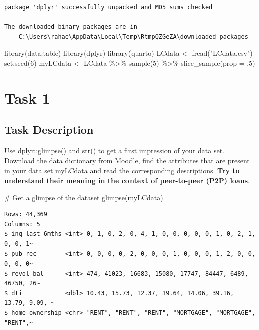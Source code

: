 \documentclass[
  letterpaper,
  DIV=11,
  numbers=noendperiod]{scrartcl}
\newenvironment{Shaded}{\begin{snugshade}}{\end{snugshade}}
\newcommand{\AttributeTok}[1]{\textcolor[rgb]{0.40,0.45,0.13}{#1}}
\newcommand{\CommentTok}[1]{\textcolor[rgb]{0.37,0.37,0.37}{#1}}
\newcommand{\DecValTok}[1]{\textcolor[rgb]{0.68,0.00,0.00}{#1}}
\newcommand{\FunctionTok}[1]{\textcolor[rgb]{0.28,0.35,0.67}{#1}}
\newcommand{\NormalTok}[1]{\textcolor[rgb]{0.00,0.23,0.31}{#1}}
\newcommand{\OtherTok}[1]{\textcolor[rgb]{0.00,0.23,0.31}{#1}}
\newcommand{\SpecialCharTok}[1]{\textcolor[rgb]{0.37,0.37,0.37}{#1}}
\newcommand{\StringTok}[1]{\textcolor[rgb]{0.13,0.47,0.30}{#1}}
\begin{document}
\begin{verbatim}
package 'dplyr' successfully unpacked and MD5 sums checked

The downloaded binary packages are in
    C:\Users\rahae\AppData\Local\Temp\RtmpQZGeZA\downloaded_packages
\end{verbatim}

\begin{Shaded}
\begin{Highlighting}[]
\FunctionTok{library}\NormalTok{(data.table)}
\FunctionTok{library}\NormalTok{(dplyr)}
\FunctionTok{library}\NormalTok{(quarto)}
\NormalTok{LCdata }\OtherTok{\textless{}{-}} \FunctionTok{fread}\NormalTok{(}\StringTok{"LCdata.csv"}\NormalTok{)}
\FunctionTok{set.seed}\NormalTok{(}\DecValTok{6}\NormalTok{)}
\NormalTok{myLCdata }\OtherTok{\textless{}{-}}\NormalTok{ LCdata }\SpecialCharTok{\%\textgreater{}\%} \FunctionTok{sample}\NormalTok{(}\DecValTok{5}\NormalTok{) }\SpecialCharTok{\%\textgreater{}\%} \FunctionTok{slice\_sample}\NormalTok{(}\AttributeTok{prop =}\NormalTok{ .}\DecValTok{5}\NormalTok{)}
\end{Highlighting}
\end{Shaded}

\hypertarget{task-1}{%
\section{Task 1}\label{task-1}}

\hypertarget{task-description}{%
\subsection{Task Description}\label{task-description}}

Use dplyr::glimpse() and str() to get a first impression of your data
set. Download the data dictionary from Moodle, find the attributes that
are present in your data set myLCdata and read the corresponding
descriptions. \textbf{Try to understand their meaning in the context of
peer-to-peer (P2P) loans}.

\begin{Shaded}
\begin{Highlighting}[]
\CommentTok{\# Get a glimpse of the dataset}
\FunctionTok{glimpse}\NormalTok{(myLCdata)}
\end{Highlighting}
\end{Shaded}

\begin{verbatim}
Rows: 44,369
Columns: 5
$ inq_last_6mths <int> 0, 1, 0, 2, 0, 4, 1, 0, 0, 0, 0, 0, 1, 0, 2, 1, 0, 0, 1~
$ pub_rec        <int> 0, 0, 0, 0, 2, 0, 0, 0, 1, 0, 0, 0, 1, 2, 0, 0, 0, 0, 0~
$ revol_bal      <int> 474, 41023, 16683, 15080, 17747, 84447, 6489, 46750, 26~
$ dti            <dbl> 10.43, 15.73, 12.37, 19.64, 14.06, 39.16, 13.79, 9.09, ~
$ home_ownership <chr> "RENT", "RENT", "RENT", "MORTGAGE", "MORTGAGE", "RENT",~
\end{verbatim}
\end{document}
